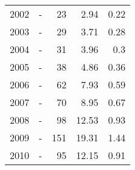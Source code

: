 \begin{longtable}{lXrrr}
        2002 & \multicolumn{1}{X}{-} & %
          \num{23} &
          \num[round-mode=places,round-precision=2]{2,94} &
          \num[round-mode=places,round-precision=2]{0,22} \\

        2003 & \multicolumn{1}{X}{-} & %
          \num{29} &
          \num[round-mode=places,round-precision=2]{3,71} &
          \num[round-mode=places,round-precision=2]{0,28} \\

        2004 & \multicolumn{1}{X}{-} & %
          \num{31} &
          \num[round-mode=places,round-precision=2]{3,96} &
          \num[round-mode=places,round-precision=2]{0,3} \\

        2005 & \multicolumn{1}{X}{-} & %
          \num{38} &
          \num[round-mode=places,round-precision=2]{4,86} &
          \num[round-mode=places,round-precision=2]{0,36} \\

        2006 & \multicolumn{1}{X}{-} & %
          \num{62} &
          \num[round-mode=places,round-precision=2]{7,93} &
          \num[round-mode=places,round-precision=2]{0,59} \\

        2007 & \multicolumn{1}{X}{-} & %
          \num{70} &
          \num[round-mode=places,round-precision=2]{8,95} &
          \num[round-mode=places,round-precision=2]{0,67} \\

        2008 & \multicolumn{1}{X}{-} & %
          \num{98} &
          \num[round-mode=places,round-precision=2]{12,53} &
          \num[round-mode=places,round-precision=2]{0,93} \\

        2009 & \multicolumn{1}{X}{-} & %
          \num{151} &
          \num[round-mode=places,round-precision=2]{19,31} &
          \num[round-mode=places,round-precision=2]{1,44} \\

        2010 & \multicolumn{1}{X}{-} & %
          \num{95} &
          \num[round-mode=places,round-precision=2]{12,15} &
          \num[round-mode=places,round-precision=2]{0,91} \\


\end{longtable}
